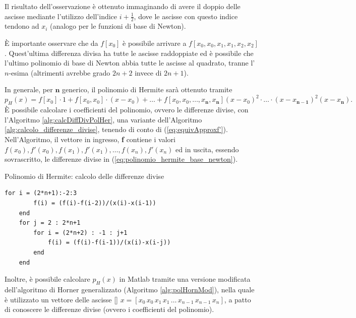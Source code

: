 Il risultato dell'osservazione è ottenuto immaginando di avere il doppio delle ascisse mediante l'utilizzo dell'indice $i+\frac{1}{2}$, dove le ascisse con questo indice tendono ad $x_i$ (analogo per le funzioni di base di Newton).
    
È importante osservare che da $f[x_0]$ è possibile arrivare a $f[x_0,x_0,x_1,x_1,x_2,x_2]$. Quest'ultima differenza divisa ha tutte le ascisse raddoppiate ed è possibile che l'ultimo polinomio di base di Newton abbia tutte le ascisse al quadrato, tranne l'$n$-esima (altrimenti avrebbe grado $2n+2$ invece di $2n+1$).

\begin{remark}
    In generale, per $\boldsymbol n$ generico, il polinomio di Hermite sarà ottenuto tramite 
    \begin{equation}\label{eq:polinomio_hermite_base_newton}
        p_H(x)=f[x_0]\cdot 1 + f[x_0,x_0]\cdot(x-x_0)+\hdots+f[x_0,x_0,\hdots,x_{\boldsymbol n},x_{\boldsymbol n}](x-x_0)^2\cdot\hdots\cdot(x-x_{\boldsymbol{n-1}})^2(x-x_{\boldsymbol n}).
    \end{equation}
    È possibile calcolare i coefficienti del polinomio, ovvero le differenze divise, con l'Algoritmo \ref{alg:calcDiffDivPolHer}, una variante dell'Algoritmo \ref{alg:calcolo_differenze_divise}, tenendo di conto di (\ref{eq:equivApproxf'}). Nell'Algoritmo, il vettore in ingresso, \textbf{f} contiene i valori $f(x_0), f'(x_0), f(x_1), f'(x_1),\hdots, f(x_n),f'(x_n)$ ed in uscita, essendo sovrascritto, le differenze divise in (\ref{eq:polinomio_hermite_base_newton}).
\end{remark}
\begin{algorithm}
\caption{Polinomio di Hermite: calcolo delle differenze divise}\label{alg:calcDiffDivPolHer}
    \begin{lstlisting}[style=Matlab-editor]
    for i = (2*n+1):-2:3
        f(i) = (f(i)-f(i-2))/(x(i)-x(i-1))
    end
    for j = 2 : 2*n+1
        for i = (2*n+2) : -1 : j+1
            f(i) = (f(i)-f(i-1))/(x(i)-x(i-j))
        end
    end
    \end{lstlisting}
\end{algorithm}

Inoltre, è possibile calcolare $p_H(x)$ in Matlab tramite una versione modificata dell'algoritmo di Horner generalizzato (Algoritmo \ref{alg:polHornMod}), nella quale è utilizzato un vettore delle ascisse [\footnotemark] $x=[x_0\, x_0\, x_1\, x_1\, \hdots\, x_{n-1}\, x_{n-1}\,x_n]$, a patto di conoscere le differenze divise (ovvero i coefficienti del polinomio). 

